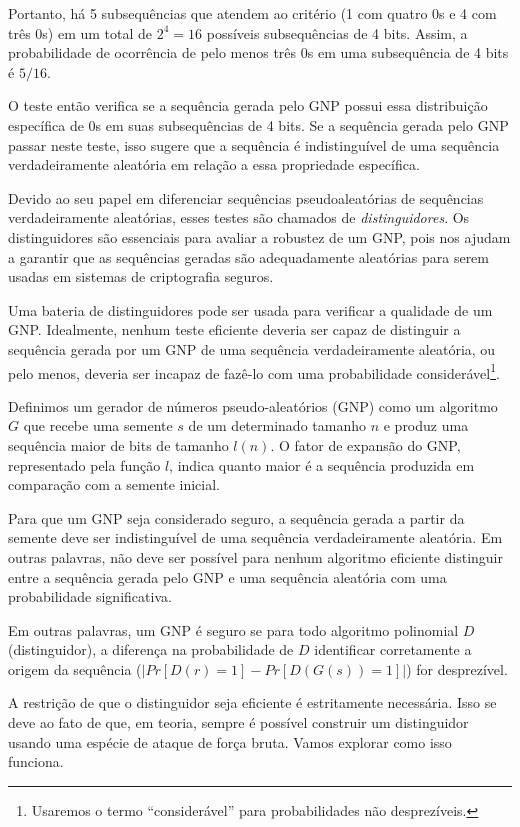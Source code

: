 Portanto, há 5 subsequências que atendem ao critério (1 com quatro $0$s e 4 com três $0$s) em um total de $2^4 = 16$ possíveis subsequências de 4 bits.
Assim, a probabilidade de ocorrência de pelo menos três $0$s em uma subsequência de 4 bits é $5/16$.

O teste então verifica se a sequência gerada pelo GNP possui essa distribuição específica de $0$s em suas subsequências de 4 bits.
Se a sequência gerada pelo GNP passar neste teste, isso sugere que a sequência é indistinguível de uma sequência verdadeiramente aleatória em relação a essa propriedade específica.

Devido ao seu papel em diferenciar sequências pseudoaleatórias de sequências verdadeiramente aleatórias, esses testes são chamados de {\em distinguidores}.
Os distinguidores são essenciais para avaliar a robustez de um GNP, pois nos ajudam a garantir que as sequências geradas são adequadamente aleatórias para serem usadas em sistemas de criptografia seguros.

Uma bateria de distinguidores pode ser usada para verificar a qualidade de um GNP.
Idealmente, nenhum teste eficiente deveria ser capaz de distinguir a sequência gerada por um GNP de uma sequência verdadeiramente aleatória, ou pelo menos, deveria ser incapaz de fazê-lo com uma probabilidade considerável\footnote{Usaremos o termo ``considerável'' para probabilidades não desprezíveis.}.

Definimos um gerador de números pseudo-aleatórios (GNP) como um algoritmo $G$ que recebe uma semente $s$ de um determinado tamanho $n$ e produz uma sequência maior de bits de tamanho $l(n)$.
O fator de expansão do GNP, representado pela função $l$, indica quanto maior é a sequência produzida em comparação com a semente inicial.

Para que um GNP seja considerado seguro, a sequência gerada a partir da semente deve ser indistinguível de uma sequência verdadeiramente aleatória.
Em outras palavras, não deve ser possível para nenhum algoritmo eficiente distinguir entre a sequência gerada pelo GNP e uma sequência aleatória com uma probabilidade significativa.

Em outras palavras, um GNP é seguro se para todo algoritmo polinomial $D$ (distinguidor), a diferença na probabilidade de $D$ identificar corretamente a origem da sequência ($|Pr[D(r) = 1] - Pr[D(G(s)) = 1]|$) for desprezível.

A restrição de que o distinguidor seja eficiente é estritamente necessária.
Isso se deve ao fato de que, em teoria, sempre é possível construir um distinguidor usando uma espécie de ataque de força bruta.
Vamos explorar como isso funciona.

